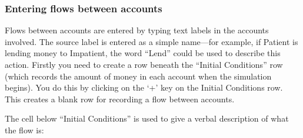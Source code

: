 \subsubsection{Entering flows between accounts}

Flows between accounts are entered by typing text labels in the accounts
involved. The source label is entered as a simple name---for example,
if Patient is lending money to Impatient, the word ``Lend'' could
be used to describe this action. Firstly you need to create a row
beneath the ``Initial Conditions'' row (which records the amount
of money in each account when the simulation begins). You do this
by clicking on the `+' key on the Initial Conditions row. This creates
a blank row for recording a flow between accounts.

\begin{center}
\par\end{center}

The cell below ``Initial Conditions'' is used to give a verbal description
of what the flow is:


